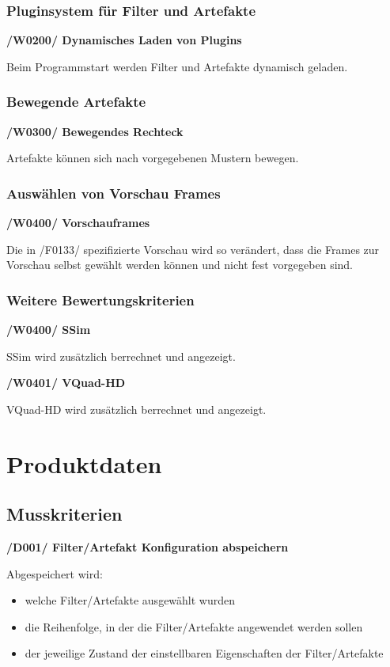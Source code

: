 \documentclass[parskip=full]{scrartcl}
\begin{document}
\subsubsection{Pluginsystem für Filter und Artefakte}

\textbf{/W0200/ Dynamisches Laden von Plugins}

Beim Programmstart werden Filter und Artefakte dynamisch geladen.

\subsubsection{Bewegende Artefakte}

\textbf{/W0300/ Bewegendes Rechteck}

Artefakte können sich nach vorgegebenen Mustern bewegen.

\subsubsection{Auswählen von Vorschau Frames}

\textbf{/W0400/ Vorschauframes}

Die in /F0133/ spezifizierte Vorschau wird so verändert, dass die Frames zur Vorschau selbst gewählt werden können und nicht fest vorgegeben sind.

\subsubsection{Weitere Bewertungskriterien}

\textbf{/W0400/ SSim}

SSim wird zusätzlich berrechnet und angezeigt.

\textbf{/W0401/ VQuad-HD}

VQuad-HD wird zusätzlich berrechnet und angezeigt.


\newpage
\section{Produktdaten}
\subsection{Musskriterien}
\textbf{/D001/ Filter/Artefakt Konfiguration abspeichern}

Abgespeichert wird:
\begin{itemize}
\item welche Filter/Artefakte ausgewählt wurden
\item die Reihenfolge, in der die Filter/Artefakte angewendet werden sollen
\item der jeweilige Zustand der einstellbaren Eigenschaften der Filter/Artefakte
\end{itemize}
\end{document}
